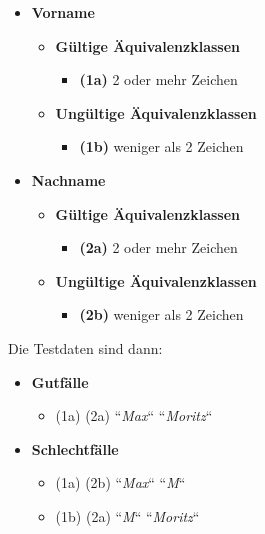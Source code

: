 \begin{itemize}
    \item \textbf{Vorname}
    \begin{itemize}
        \item \textbf{Gültige Äquivalenzklassen}
        \begin{itemize}
            \item[] \textbf{(1a)} 2 oder mehr Zeichen
        \end{itemize}
        \item \textbf{Ungültige Äquivalenzklassen}
        \begin{itemize}
            \item[] \textbf{(1b)} weniger als 2 Zeichen
        \end{itemize}
    \end{itemize}
    \item \textbf{Nachname}
    \begin{itemize}
        \item \textbf{Gültige Äquivalenzklassen}
        \begin{itemize}
            \item[] \textbf{(2a)} 2 oder mehr Zeichen
        \end{itemize}
        \item \textbf{Ungültige Äquivalenzklassen}
        \begin{itemize}
            \item[] \textbf{(2b)} weniger als 2 Zeichen
        \end{itemize}
    \end{itemize}
\end{itemize}

\noindent
Die Testdaten sind dann:

\begin{itemize}
    \item \textbf{Gutfälle}
    \begin{itemize}
        \item[] (1a) (2a) ``\textit{Max}`` ``\textit{Moritz}``
    \end{itemize}
    \item \textbf{Schlechtfälle}
    \begin{itemize}
        \item[] (1a) (2b) ``\textit{Max}`` ``\textit{M}``
        \item[] (1b) (2a) ``\textit{M}`` ``\textit{Moritz}``
    \end{itemize}
\end{itemize}

